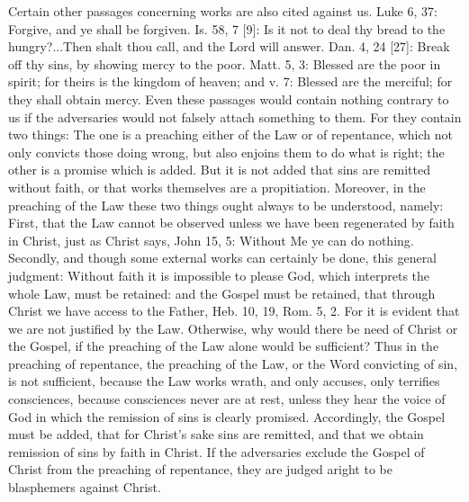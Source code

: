 Certain other passages concerning works are also cited against us.
Luke 6, 37: Forgive, and ye shall be forgiven.  Is. 58, 7 [9]: Is it
not to deal thy bread to the hungry?...Then shalt thou call, and the
Lord will answer.  Dan. 4, 24 [27]: Break off thy sins, by showing
mercy to the poor.  Matt. 5, 3: Blessed are the poor in spirit; for
theirs is the kingdom of heaven; and v. 7: Blessed are the merciful;
for they shall obtain mercy.  Even these passages would contain
nothing contrary to us if the adversaries would not falsely attach
something to them.  For they contain two things: The one is a
preaching either of the Law or of repentance, which not only convicts
those doing wrong, but also enjoins them to do what is right; the
other is a promise which is added.  But it is not added that sins are
remitted without faith, or that works themselves are a propitiation.
Moreover, in the preaching of the Law these two things ought always
to be understood, namely: First, that the Law cannot be observed
unless we have been regenerated by faith in Christ, just as Christ
says, John 15, 5: Without Me ye can do nothing.  Secondly, and though
some external works can certainly be done, this general judgment:
Without faith it is impossible to please God, which interprets the
whole Law, must be retained: and the Gospel must be retained, that
through Christ we have access to the Father, Heb. 10, 19, Rom. 5, 2.
For it is evident that we are not justified by the Law.  Otherwise,
why would there be need of Christ or the Gospel, if the preaching of
the Law alone would be sufficient?  Thus in the preaching of
repentance, the preaching of the Law, or the Word convicting of sin,
is not sufficient, because the Law works wrath, and only accuses,
only terrifies consciences, because consciences never are at rest,
unless they hear the voice of God in which the remission of sins is
clearly promised.  Accordingly, the Gospel must be added, that for
Christ's sake sins are remitted, and that we obtain remission of sins
by faith in Christ.  If the adversaries exclude the Gospel of Christ
from the preaching of repentance, they are judged aright to be
blasphemers against Christ.

